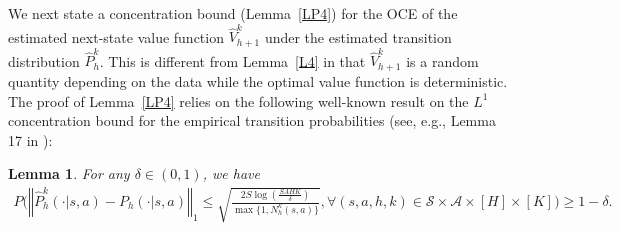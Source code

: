 \documentclass[11pt]{article}
\newtheorem{lemma}{Lemma}
\newcommand{\1}{\mathbbm{1}}
\newcommand{\gao}[1]{\textcolor{blue}{{#1}}} %
\begin{document}
We next state a concentration bound (Lemma~\ref{LP4}) for the OCE of the estimated next-state value function $\hat{V}_{h+1}^k$ under the estimated transition distribution $\hat{P}_h^k$. This is different from Lemma~\ref{L4} in that $\hat{V}_{h+1}^k$ is a random quantity depending on the data while the optimal value function is deterministic. The proof of Lemma~\ref{LP4} relies on the following well-known result on the $L^1$ concentration bound for the empirical transition probabilities (see, e.g., Lemma 17 in \cite{jaksch10a}):
\begin{lemma}\label{PROB}
For any $\delta\in (0,1)$, we have
\begin{align*}
P\Bigg(\left\Vert \hat{P}_h^k(\cdot\vert s,a)-P_h(\cdot\vert s,a)\right\Vert_1 \leq \sqrt{\frac{2S\log\left(\frac{SAHK}{\delta}\right)}{\max\{1,N_h^k(s,a)\}}}, \forall (s,a,h,k)\in \mathcal{S}\times \mathcal{A}\times [H]\times [K]\Bigg )\geq 1-\delta.
\end{align*}
\end{lemma}






\end{document}
